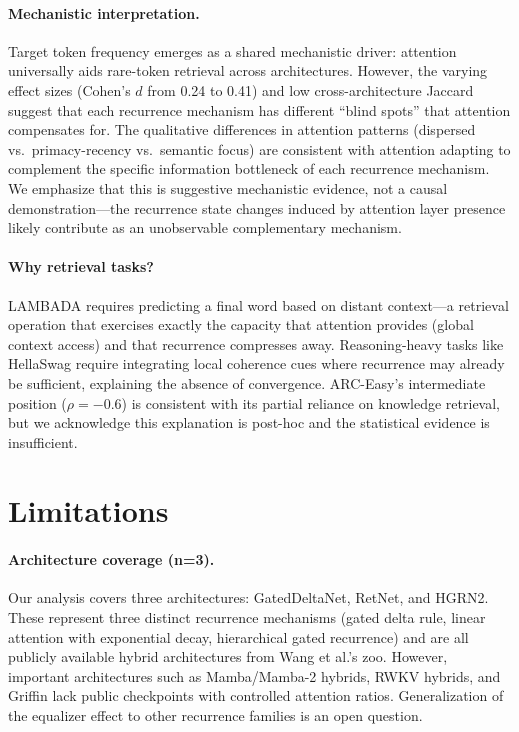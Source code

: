 \documentclass[11pt,a4paper]{article}
\begin{document}
\paragraph{Mechanistic interpretation.}
Target token frequency emerges as a shared mechanistic driver: attention universally aids rare-token retrieval across architectures. However, the varying effect sizes (Cohen's $d$ from 0.24 to 0.41) and low cross-architecture Jaccard suggest that each recurrence mechanism has different ``blind spots'' that attention compensates for. The qualitative differences in attention patterns (dispersed vs.\ primacy-recency vs.\ semantic focus) are consistent with attention adapting to complement the specific information bottleneck of each recurrence mechanism. We emphasize that this is suggestive mechanistic evidence, not a causal demonstration---the recurrence state changes induced by attention layer presence likely contribute as an unobservable complementary mechanism.

\paragraph{Why retrieval tasks?}
LAMBADA requires predicting a final word based on distant context---a retrieval operation that exercises exactly the capacity that attention provides (global context access) and that recurrence compresses away. Reasoning-heavy tasks like HellaSwag require integrating local coherence cues where recurrence may already be sufficient, explaining the absence of convergence. ARC-Easy's intermediate position ($\rho{=}{-}0.6$) is consistent with its partial reliance on knowledge retrieval, but we acknowledge this explanation is post-hoc and the statistical evidence is insufficient.

\section{Limitations}

\paragraph{Architecture coverage (n=3).}
Our analysis covers three architectures: GatedDeltaNet, RetNet, and HGRN2. These represent three distinct recurrence mechanisms (gated delta rule, linear attention with exponential decay, hierarchical gated recurrence) and are all publicly available hybrid architectures from Wang et al.'s zoo. However, important architectures such as Mamba/Mamba-2 hybrids, RWKV hybrids, and Griffin lack public checkpoints with controlled attention ratios. Generalization of the equalizer effect to other recurrence families is an open question.
\end{document}
